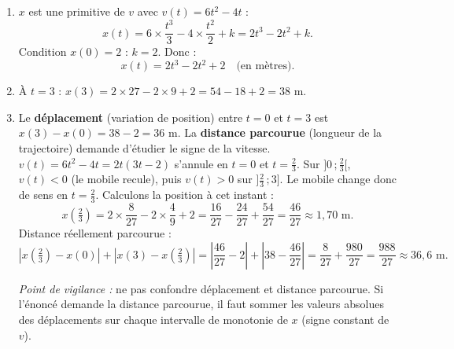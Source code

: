 \documentclass[11pt]{article}
\begin{document}
\begin{corrige}
\begin{enumerate}
\item $x$ est une primitive de $v$ avec $v(t) = 6t^2 - 4t$ :
\[
x(t) = 6 \times \frac{t^3}{3} - 4 \times \frac{t^2}{2} + k = 2t^3 - 2t^2 + k.
\]
Condition $x(0) = 2$ : $k = 2$. Donc :
\[
x(t) = 2t^3 - 2t^2 + 2 \quad \text{(en mètres)}.
\]
\item À $t = 3$ : $x(3) = 2 \times 27 - 2 \times 9 + 2 = 54 - 18 + 2 = 38$ m.
\item Le \textbf{déplacement} (variation de position) entre $t = 0$ et $t = 3$ est $x(3) - x(0) = 38 - 2 = 36$ m.
La \textbf{distance parcourue} (longueur de la trajectoire) demande d'étudier le signe de la vitesse.
$v(t) = 6t^2 - 4t = 2t(3t-2)$ s'annule en $t = 0$ et $t = \tfrac{2}{3}$.
Sur $]0\,;\tfrac{2}{3}[$, $v(t) < 0$ (le mobile recule), puis $v(t) > 0$ sur $]\tfrac{2}{3}\,;3]$. Le mobile change donc de sens en $t = \frac{2}{3}$.
Calculons la position à cet instant :
\[
x\left(\tfrac{2}{3}\right) = 2 \times \frac{8}{27} - 2 \times \frac{4}{9} + 2 = \frac{16}{27} - \frac{24}{27} + \frac{54}{27} = \frac{46}{27} \approx 1{,}70 \text{ m}.
\]
Distance réellement parcourue :
\[
\left|x\left(\tfrac{2}{3}\right) - x(0)\right| + \left|x(3) - x\left(\tfrac{2}{3}\right)\right| = \left|\frac{46}{27} - 2\right| + \left|38 - \frac{46}{27}\right| = \frac{8}{27} + \frac{980}{27} = \frac{988}{27} \approx 36{,}6 \text{ m}.
\]

\emph{Point de vigilance :} ne pas confondre déplacement et distance parcourue. Si l'énoncé demande la distance parcourue, il faut sommer les valeurs absolues des déplacements sur chaque intervalle de monotonie de $x$ (signe constant de $v$).
\end{enumerate}
\end{corrige}
\end{document}

